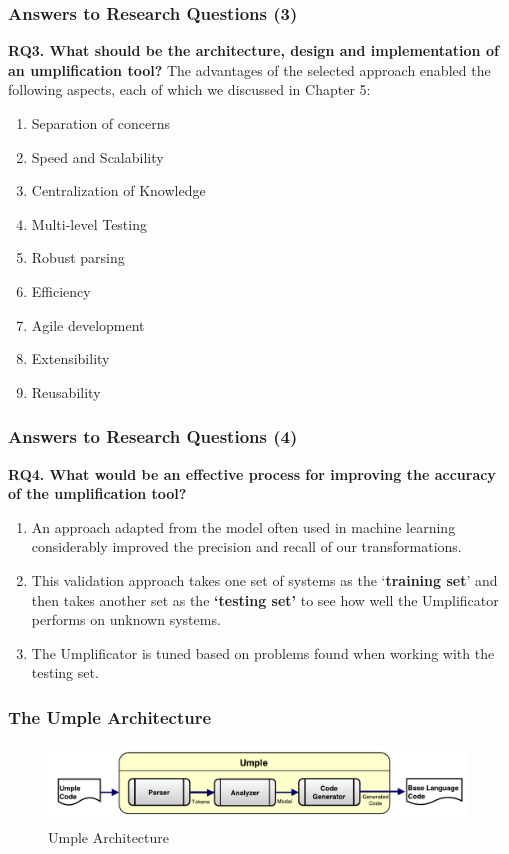 \documentclass[xcolor=table]{beamer}
\begin{document}
\begin{frame}
\frametitle{Answers to Research Questions (3)}

\textcolor{important}{\textbf{RQ3. What should be the architecture, design and implementation of an umplification tool?}}
The advantages of the selected approach enabled the following aspects, each of which we discussed in Chapter 5:

\begin{enumerate}

\item Separation of concerns
\item Speed and Scalability
\item Centralization of Knowledge
\item Multi-level Testing
\item Robust parsing 
\item Efficiency
\item Agile development 
\item Extensibility
\item Reusability
\end{enumerate}

\end{frame}

\begin{frame}
\frametitle{Answers to Research Questions (4) }
\textcolor{important}{\textbf{RQ4. What would be an effective process for improving the accuracy of the umplification tool?}}
\begin{enumerate}
\item An approach adapted from the model often used in machine learning considerably improved the precision and recall of our transformations.
\item This validation approach takes one set of systems as the \textcolor{important}{`\textbf{training set}'} and then takes another set as the \textcolor{important}{\textbf{`testing set'}} to see how well the Umplificator performs on unknown systems. 
\item The Umplificator is tuned based on problems found when working with the testing set. 
\end{enumerate}
\end{frame}

\begin{frame}
\frametitle{The Umple Architecture}
\begin{figure}[h]
\centering
\includegraphics[width=0.99\textwidth]{Figures/umpleArchitecture.pdf} 
\caption{Umple Architecture}
\label{fig:umpleArchitecture}
\end{figure}
\centering
{}
\centering
\end{frame}
\end{document}
